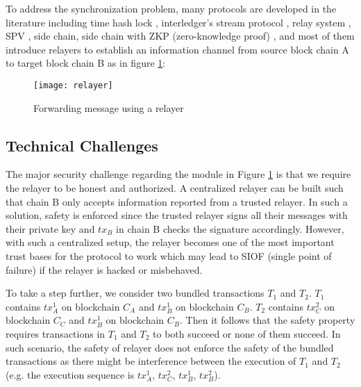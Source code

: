 To address the synchronization problem, many protocols are developed in the literature including time hash lock \cite{poon2016bitcoin}, interledger’s stream protocol \cite{zhang2021enabling}, relay system \cite{lys2021r}, SPV \cite{nakamoto2008bitcoin}, side chain\cite{singh2020sidechain,deng2018sidechain}, side chain with ZKP (zero-knowledge proof) \cite{sidechainzkp}, and most of them introduce relayers \cite{sun2020collaborative-relay, warren20170x-relay} to establish an information channel from source block chain A to target block chain B as in figure \ref{relayer-connection}:
\begin{figure}[!ht]
\centerline{\texttt{[image: relayer]}}
\caption{Forwarding message using a relayer}
\label{relayer-connection}
\end{figure}

\subsection{Technical Challenges}
The major security challenge regarding the module in Figure \ref{relayer-connection} is that we require the relayer to be honest and authorized. A centralized relayer can be built such that chain B only accepts information reported from a trusted relayer. In such a solution, safety is enforced since the trusted relayer signs all their messages with their private key and $tx_B$ in chain B checks the signature accordingly. However, with such a centralized setup, the relayer becomes one of the most important trust bases for the protocol to work which may lead to SIOF (single point of failure) if the relayer is hacked or misbehaved.


To take a step further, we consider two bundled transactions $T_1$ and $T_2$. $T_1$ contains $tx_A^1$ on blockchain $C_A$ and $tx_B^1$ on blockchain $C_B$. $T_2$ contains $tx^2_C$ on blockchain $C_C$ and $tx_B^1$ on blockchain $C_B$. Then it follows that the safety property requires transactions in $T_1$ and $T_2$ to both succeed or none of them succeed. In such scenario, the safety of relayer does not enforce the safety of the bundled transactions as there might be interference between the execution of $T_1$ and $T_2$ (e.g. the execution sequence is $tx_A^1$, $tx_C^2$, $tx_B^1$, $tx_B^2$). 

